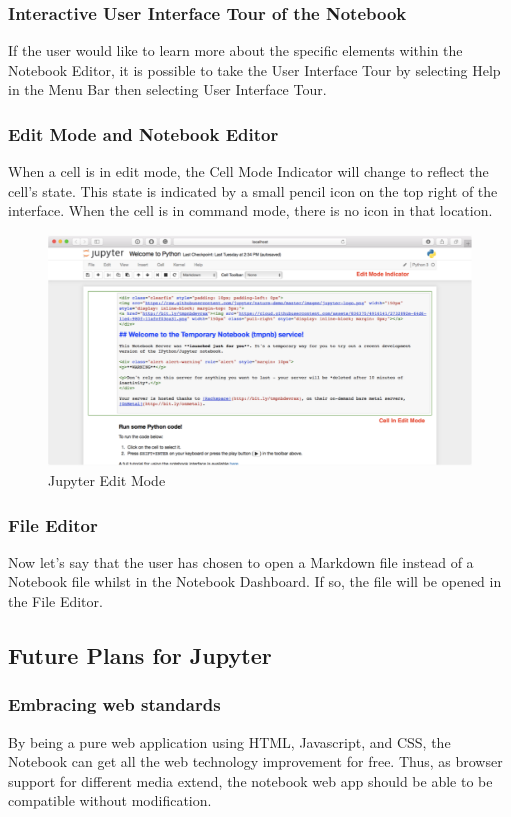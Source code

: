 \subsubsection{Interactive User Interface Tour of the Notebook}
If the user would like to learn more about the specific elements within the Notebook Editor,
it is possible to take the User Interface Tour by selecting Help in the Menu Bar then selecting User Interface Tour.

\subsubsection{Edit Mode and Notebook Editor}
When a cell is in edit mode, the Cell Mode Indicator will change to reflect the cell’s
state. This state is indicated by a small pencil icon on the top right of the
interface. When the cell is in command mode, there is no icon in that location.

\begin{figure}[ht]\centering
  \includegraphics[width=\textwidth]{EditMode}
  \caption{Jupyter Edit Mode}\label{fig:edit-mode}
\end{figure} 

\subsubsection{File Editor }
Now let’s say that the user has chosen to open a Markdown file instead of a Notebook file whilst
in the Notebook Dashboard. If so, the file will be opened in the File Editor.

\subsection{Future Plans for Jupyter}

\subsubsection{Embracing web standards}
By being a pure web application using HTML, Javascript, and CSS, the Notebook can get all
the web technology improvement for free. Thus, as browser support for different media
extend, the notebook web app should be able to be compatible without modification.

